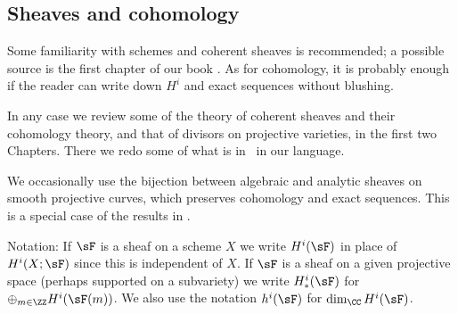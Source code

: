 \subsection {Sheaves and cohomology} 

Some familiarity with schemes and coherent sheaves is recommended; a possible source is
the first chapter of our book \cite{GeomSchemes}.
As for cohomology, it is probably enough if the reader can write down $H^i$ and exact sequences without blushing.

In any case we review some of the theory of coherent sheaves and their cohomology theory, and that of divisors on projective 
varieties, in the first two Chapters. There we redo some of what is in~\cite[Chapter IV]{Hartshorne1977}  in our language. 

We occasionally use the bijection between algebraic and analytic sheaves on smooth projective curves, which preserves
cohomology and exact sequences. This is a special case of the results in \cite{GAGA}. 

Notation: If $\sF$ is a sheaf on a scheme $X$ we write $H^i(\sF)$ in place of $H^i(X; \sF)$ since this is independent of $X$.
If $\sF$ is a sheaf on a given projective space (perhaps supported on a subvariety) we write $H^i_*(\sF)$ for
$\oplus_{m\in \ZZ} H^i(\sF(m))$. We also use the notation $h^i(\sF)$ for $\dim_\CC H^i(\sF)$.







%
%
%




